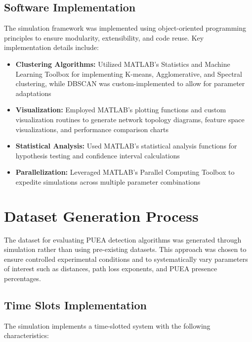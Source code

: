 \subsection{Software Implementation}

The simulation framework was implemented using object-oriented programming principles to ensure modularity, extensibility, and code reuse. Key implementation details include:

\begin{itemize}
    \item \textbf{Clustering Algorithms:} Utilized MATLAB's Statistics and Machine Learning Toolbox for implementing K-means, Agglomerative, and Spectral clustering, while DBSCAN was custom-implemented to allow for parameter adaptations
    
    \item \textbf{Visualization:} Employed MATLAB's plotting functions and custom visualization routines to generate network topology diagrams, feature space visualizations, and performance comparison charts
    
    \item \textbf{Statistical Analysis:} Used MATLAB's statistical analysis functions for hypothesis testing and confidence interval calculations
    
    \item \textbf{Parallelization:} Leveraged MATLAB's Parallel Computing Toolbox to expedite simulations across multiple parameter combinations
\end{itemize}

\section{Dataset Generation Process}

The dataset for evaluating PUEA detection algorithms was generated through simulation rather than using pre-existing datasets. This approach was chosen to ensure controlled experimental conditions and to systematically vary parameters of interest such as distances, path loss exponents, and PUEA presence percentages.

\subsection{Time Slots Implementation}

The simulation implements a time-slotted system with the following characteristics:


